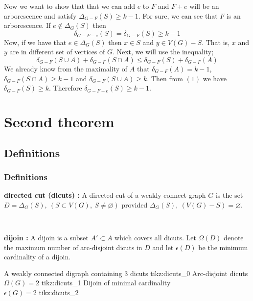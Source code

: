 \documentclass[8pt]{beamer}
\begin{document}
\begin{frame}


Now we want to show that that we can add $e$ to $F$ and $F+e$ will be an arborescence and satisfy $\Delta_{G-F}(S) \ge k-1$. For sure, we can see that $F$ is an arborescence. If $e\not\in \Delta_G(S)$ then $$\delta_{G-F-e}(S) = \delta_{G-F}(S) \ge k-1$$
Now, if we have that $e\in \Delta_G(S)$ then $x\in S$ and $y\in V(G)-S$. That is, $x$ and $y$ are in different set of vertices of $G$. Next, we will use the inequality; 
\begin{equation}\delta_{G-F}(S\cup A) + \delta_{G-F}(S\cap A) \le \delta_{G-F}(S) + \delta_{G-F}(A)\end{equation}
We already know from the maximality of $A$ that $\delta_{G-F}(A)=k-1$, $\delta_{G-F}(S\cap A) \ge k-1$ and $\delta_{G-F}(S\cup A) \ge k$. Then from $(1)$ we have $\delta_{G-F}(S) \ge k$. Therefore $\delta_{G-F-e}(S) \ge k-1$. 
\eofproof
\end{frame}

\section{Second theorem}
\subsection{Definitions}
\begin{frame}
\frametitle{Definitions}

\textbf{directed cut (dicuts) :}
A directed cut of a weakly connect graph $G$ is the set $D = \Delta_G(S),\ (S \subset V(G),\ S \neq \varnothing)$ provided $\Delta_G(S),\ (V(G) - S) = \varnothing$.

~
    
\textbf{dijoin :} A dijoin is a subset $A' \subset A$ which covers all dicuts. Let $\Omega(D)$ denote the maximum number of arc-disjoint dicuts in $D$ 
and let $\epsilon(D)$ be the minimum cardinality of a dijoin.

\threesplitpage
{
    {A weakly connected digraph containing 3 dicuts}
    {tikz:dicuts_0}
}{
    {Arc-disjoint dicuts\\$\Omega(G) = 2$}
    {tikz:dicuts_1}
}{
    {Dijoin of minimal cardinality\\$\epsilon(G) = 2$}
    {tikz:dicuts_2}
}

\end{frame}
\end{document}
